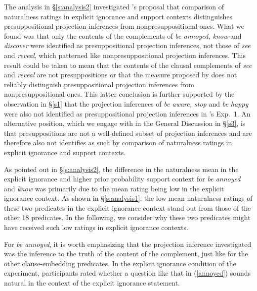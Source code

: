 \documentclass[11pt,fleqn]{article}
\newcommand{\6}{\mbox{$[\hspace*{-.6mm}[$}}
\newcommand{\9}{\mbox{$]\hspace*{-.6mm}]$}}
\newcommand{\citepos}[1]{\citeauthor{#1}'s \citeyear{#1}}
\begin{document}
The analysis in \S\ref{s:analysis2} investigated \citepos{mandelkern-etal2020} proposal that comparison of naturalness ratings in explicit ignorance and support contexts distinguishes presuppositional projection inferences from nonpresuppositional ones. What we found was that only the contents of the complements of \emph{be annoyed, know} and \emph{discover} were identified as presuppositional projection inferences, not those of \emph{see} and \emph{reveal}, which patterned like nonpresuppositional projection inferences. This result could be taken to mean that the contents of the clausal complements of \emph{see} and \emph{reveal} are not presuppositions or that the measure proposed by \citealt{mandelkern-etal2020} does not reliably distinguish presuppositional projection inferences from nonpresuppositional ones. This latter conclusion is further supported by the observation in \S\ref{s1} that  the projection inferences of \emph{be aware, stop} and \emph{be happy} were also not identified as presuppositional projection inferences in \citepos{kalomoiros-schwarz2024} Exp.~1. An alternative position, which we engage with in the General Discussion in \S\ref{s3}, is that presuppositions are not a well-defined subset of projection inferences and are therefore also not identifies as such by comparison of naturalness ratings in explicit ignorance and support contexts.

As pointed out in \S\ref{s:analysis2}, the difference in the naturalness mean in the explicit ignorance and higher prior probability support context for \emph{be annoyed} and \emph{know} was primarily due to the mean rating being low in the explicit ignorance context. As shown in \S\ref{s:analysis1}, the low mean naturalness ratings of these two predicates in the explicit ignorance context stand out from those of the other 18 predicates. In the following, we consider why these two predicates might have received such low ratings in explicit ignorance contexts. 

For \emph{be annoyed}, it is worth emphasizing that the projection inference investigated was the inference to the truth of the content of the complement, just like for the other clause-embedding predicates. In the explicit ignorance condition of the experiment, participants rated whether a question like that in (\ref{annoyed}) sounds natural in the context of the explicit ignorance statement. 
\end{document}
